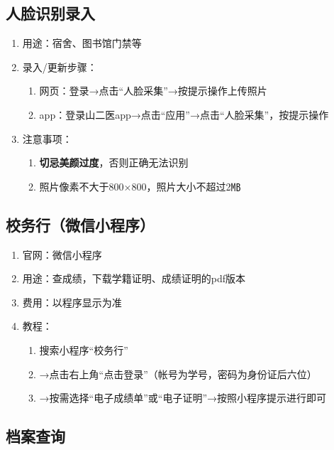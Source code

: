 \subsection[人脸识别录入]{人脸识别录入}
\label{face_system}
\begin{enumerate}
    \item 用途：宿舍、图书馆门禁等
    \item 录入/更新步骤：
          \begin{enumerate}
              \item 网页：登录→点击“人脸采集”→按提示操作上传照片
              \item app：登录山二医app→点击“应用”→点击“人脸采集”，按提示操作
          \end{enumerate}
    \item 注意事项：
          \begin{enumerate}
              \item \textbf{切忌美颜过度}，否则正确无法识别
              \item 照片像素不大于800×800，照片大小不超过2㎆
          \end{enumerate}
\end{enumerate}

\subsection[校务行（微信小程序）]{校务行（微信小程序）}
\label{cert_prover}
\begin{enumerate}
    \item 官网：微信小程序
    \item 用途：查成绩，下载学籍证明、成绩证明的pdf版本
    \item 费用：以程序显示为准
    \item 教程：
          \begin{enumerate}
              \item 搜索小程序“校务行”
              \item →点击右上角“点击登录”（帐号为学号，密码为身份证后六位）\footnotemark
              \item →按需选择“电子成绩单”或“电子证明”→按照小程序提示进行即可
          \end{enumerate}
\end{enumerate}

\subsection[档案查询]{档案查询}
